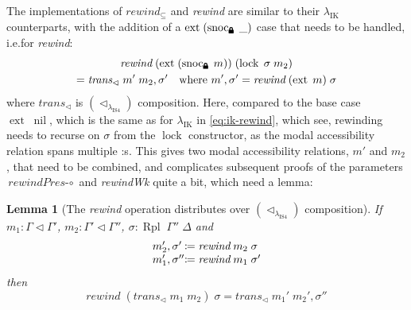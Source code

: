 \documentclass[12pt,twoside,openright]{report}
\numberwithin{equation}{chapter}
\numberwithin{figure}{chapter}
\numberwithin{table}{chapter}
\newtheorem{lemma}[theorem]{Lemma}
\theoremstyle{definition}\newtheorem{definition}{Definition}
\newcommand{\lock}{\text{\tikz[baseline]{
      \fill[rounded corners=.1ex] (-.75ex,0) rectangle (.75ex,1ex);
      \draw[line width=.3ex] (-.4ex,.5ex) -- ++(0,.75ex) arc (180:0:.4ex) -- ++(0,-.75ex);
}}}
\begin{document}
The implementations of $\textit{rewind}_\subseteq$ and \textit{rewind}
are similar to their $\lambda_\text{IK}$ counterparts,
with the addition of a $\operatorname{ext} \; (\operatorname{snoc}_\lock \; \_)$ case
that needs to be handled, i.e.\@ for \textit{rewind}:
\begin{multline*}
  \textit{rewind} \; (\operatorname{ext} \; (\operatorname{snoc}_\lock \; m)) \; (\operatorname{lock} \; \sigma \; m_2) \\
  = \textit{trans}_\lhd \; m' \; m_2 , \sigma' \quad \text{where } m' , \sigma' = \textit{rewind} \; (\operatorname{ext} \; m) \; \sigma
\end{multline*}
where $\textit{trans}_\lhd$ is $(\lhd_{\lambda_\text{IS4}})$ composition.
Here, compared to the base case $\operatorname{ext} \; \operatorname{nil}$,
which is the same as for $\lambda_\text{IK}$ in \autoref{eq:ik-rewind}, which see,
rewinding needs to recurse on $\sigma$ from the $\operatorname{lock}$ constructor,
as the modal accessibility relation spans multiple \lock:s.
This gives two modal accessibility relations, $m'$ and $m_2$,
that need to be combined,
and complicates subsequent proofs of the parameters
$\textit{rewindPres-}\circ$ and \textit{rewindWk} quite a bit,
which need a lemma:
\begin{lemma}[The \textit{rewind} operation distributes over $(\lhd_{\lambda_\text{IS4}})$ composition]\label{thm:rewindPresTrans}
  If $m_1 : \Gamma \lhd \Gamma'$, $m_2 : \Gamma' \lhd \Gamma''$, $\sigma : \operatorname{Rpl} \; \Gamma'' \; \Delta$ and
  \begin{equation*}
    \begin{array}{l@{\,}l@{}l}
      m_2', &\sigma'  &\coloneqq \textit{rewind} \; m_2 \; \sigma \\
      m_1', &\sigma'' &\coloneqq \textit{rewind} \; m_1 \; \sigma'
    \end{array}
  \end{equation*}
  then
  $$ \textit{rewind} \; (\textit{trans}_\lhd \; m_1 \; m_2) \; \sigma = \textit{trans}_\lhd \; m_1' \; m_2' , \sigma'' $$
\end{lemma}
\end{document}
